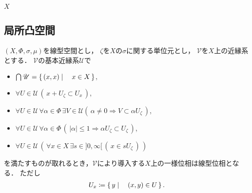 	\begin{screen}
		\begin{thm}
			
		\end{thm}
	\end{screen}
	
	\begin{screen}
		\begin{thm}[開写像原理]
			$X$
		\end{thm}
	\end{screen}

\subsection{局所凸空間}
	\begin{screen}
		\begin{thm}[近縁系で導入する一様位相が線型位相となるとき]
		\label{thm:entourages_introducing_vector_topology}
			$(X,\Phi,\sigma,\mu)$を線型空間とし，
			$\zeta$を$X$の$\sigma$に関する単位元とし，
			$\mathscr{V}$を$X$上の近縁系とする．
			$\mathscr{V}$の基本近縁系$\mathscr{U}$で
			\begin{itemize}
				\item $\bigcap \mathscr{U} = \left\{\, (x,x) \mid \quad x \in X\, \right\}$,
				\item $\forall U \in \mathscr{U}\, \left(\, x + U_\zeta \subset U_x\, \right)$,
				\item $\forall U \in \mathscr{U}\, \forall \alpha \in \Phi\,
					\exists V \in \mathscr{U} \left(\, \alpha \neq 0 \Longrightarrow V \subset \alpha U_\zeta\, \right)$,
				\item $\forall U \in \mathscr{U}\, \forall \alpha \in \Phi\,
					\left(\, |\alpha| \leq 1 \Longrightarrow \alpha U_\zeta \subset U_\zeta\, \right)$,
				\item $\forall U \in \mathscr{U}\, \left(\, \forall x \in X\, 
				\exists s \in ]0,\infty[\, (\, x \in s U_\zeta\, )\, \right)$
			\end{itemize}
			を満たすものが取れるとき，$\mathscr{V}$により導入する$X$上の一様位相は線型位相となる．
			ただし
			\begin{align}
				U_x \coloneqq \left\{\, y \mid \quad (x,y) \in U\, \right\}.
			\end{align}
		\end{thm}
	\end{screen}
	
